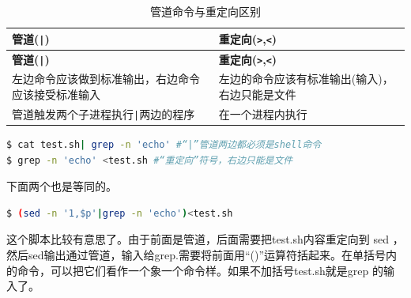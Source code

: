 \documentclass[doctor,openright,twoside]{sjtuthesis}
\newcommand{\passthrough}[1]{#1}
\theoremstyle{plain}
\theoremstyle{definition}
\theoremstyle{remark}
\theoremstyle{ocrenumbox}
\theoremstyle{plain}
\begin{document}
\begin{longtable}[]{@{}ll@{}}
\caption{管道命令与重定向区别}\tabularnewline
\toprule
\begin{minipage}[b]{0.55\columnwidth}\raggedright
\textbf{管道(\passthrough{\lstinline!|!})}\strut
\end{minipage} & \begin{minipage}[b]{0.40\columnwidth}\raggedright
\textbf{重定向(\passthrough{\lstinline!>!},\passthrough{\lstinline!<!})}\strut
\end{minipage}\tabularnewline
\midrule
\endfirsthead
\toprule
\begin{minipage}[b]{0.55\columnwidth}\raggedright
\textbf{管道(\passthrough{\lstinline!|!})}\strut
\end{minipage} & \begin{minipage}[b]{0.40\columnwidth}\raggedright
\textbf{重定向(\passthrough{\lstinline!>!},\passthrough{\lstinline!<!})}\strut
\end{minipage}\tabularnewline
\midrule
\endhead
\begin{minipage}[t]{0.55\columnwidth}\raggedright
左边命令应该做到标准输出，右边命令应该接受标准输入\strut
\end{minipage} & \begin{minipage}[t]{0.40\columnwidth}\raggedright
左边的命令应该有标准输出(输入)，右边只能是文件\strut
\end{minipage}\tabularnewline
\begin{minipage}[t]{0.55\columnwidth}\raggedright
管道触发两个子进程执行\passthrough{\lstinline!|!}两边的程序\strut
\end{minipage} & \begin{minipage}[t]{0.40\columnwidth}\raggedright
在一个进程内执行\strut
\end{minipage}\tabularnewline
\bottomrule
\end{longtable}

\begin{lstlisting}[language=bash]
$ cat test.sh| grep -n 'echo' #“|”管道两边都必须是shell命令
$ grep -n 'echo' <test.sh #“重定向”符号，右边只能是文件
\end{lstlisting}

下面两个也是等同的。

\begin{lstlisting}[language=bash]
$ (sed -n '1,$p'|grep -n 'echo')<test.sh 
\end{lstlisting}

这个脚本比较有意思了。由于前面是管道，后面需要把test.sh内容重定向到 sed ，然后sed输出通过管道，输入给grep.需要将前面用``()''运算符括起来。在单括号内的命令，可以把它们看作一个象一个命令样。如果不加括号test.sh就是grep 的输入了。
\end{document}
